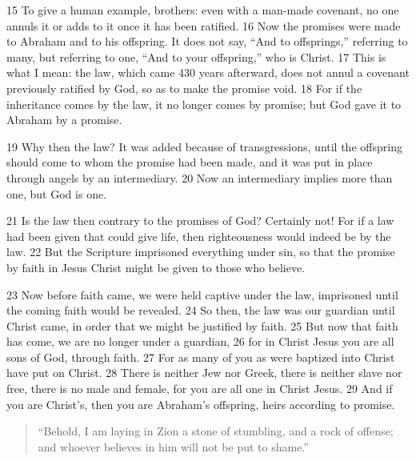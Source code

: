 \begin{bible}
15 To give a human example, brothers: even with a man-made covenant, no one annuls it or adds to it once it has been ratified. 16 Now the promises were made to Abraham and to his offspring. It does not say, ``And to offsprings,'' referring to many, but referring to one, ``And to your offspring,'' who is Christ. 17 This is what I mean: the law, which came 430 years afterward, does not annul a covenant previously ratified by God, so as to make the promise void. 18 For if the inheritance comes by the law, it no longer comes by promise; but God gave it to Abraham by a promise.

19 Why then the law? It was added because of transgressions, until the offspring should come to whom the promise had been made, and it was put in place through angels by an intermediary. 20 Now an intermediary implies more than one, but God is one.

21 Is the law then contrary to the promises of God? Certainly not! For if a law had been given that could give life, then righteousness would indeed be by the law. 22 But the Scripture imprisoned everything under sin, so that the promise by faith in Jesus Christ might be given to those who believe.

23 Now before faith came, we were held captive under the law, imprisoned until the coming faith would be revealed. 24 So then, the law was our guardian until Christ came, in order that we might be justified by faith. 25 But now that faith has come, we are no longer under a guardian, 26 for in Christ Jesus you are all sons of God, through faith. 27 For as many of you as were baptized into Christ have put on Christ. 28 There is neither Jew nor Greek, there is neither slave nor free, there is no male and female, for you are all one in Christ Jesus. 29 And if you are Christ's, then you are Abraham's offspring, heirs according to promise.

\begin{quote}
``Behold, I am laying in Zion a stone of stumbling, and a rock of offense; and whoever believes in him will not be put to shame.''
\end{quote}
		
\end{bible}

